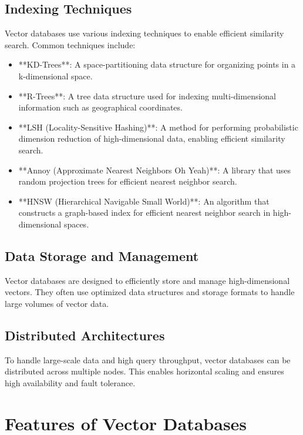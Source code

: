 \subsection{Indexing Techniques}
Vector databases use various indexing techniques to enable efficient similarity search. Common techniques include:
\begin{itemize}
    \item **KD-Trees**: A space-partitioning data structure for organizing points in a k-dimensional space.
    \item **R-Trees**: A tree data structure used for indexing multi-dimensional information such as geographical coordinates.
    \item **LSH (Locality-Sensitive Hashing)**: A method for performing probabilistic dimension reduction of high-dimensional data, enabling efficient similarity search.
    \item **Annoy (Approximate Nearest Neighbors Oh Yeah)**: A library that uses random projection trees for efficient nearest neighbor search.
    \item **HNSW (Hierarchical Navigable Small World)**: An algorithm that constructs a graph-based index for efficient nearest neighbor search in high-dimensional spaces.
\end{itemize}

\subsection{Data Storage and Management}
Vector databases are designed to efficiently store and manage high-dimensional vectors. They often use optimized data structures and storage formats to handle large volumes of vector data.

\subsection{Distributed Architectures}
To handle large-scale data and high query throughput, vector databases can be distributed across multiple nodes. This enables horizontal scaling and ensures high availability and fault tolerance.

\section{Features of Vector Databases}

